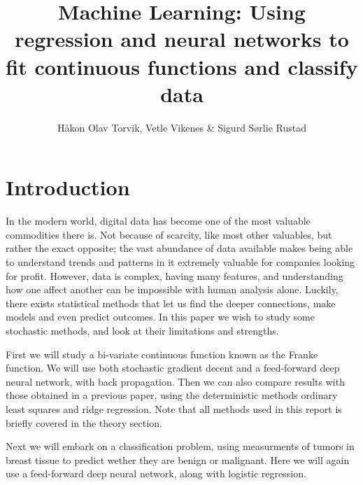 \documentclass[12pt]{extarticle}
\author{\Large Håkon Olav Torvik, Vetle Vikenes \& Sigurd Sørlie Rustad}
\title{\Huge Machine Learning: Using regression and neural networks to fit continuous functions and classify data}
\affiliation{\large FYS-STK4155 – Applied Data Analysis and Machine Learning
\\Autumn 2021\\Department of Physics\\University of Oslo\\\\\today}
\begin{document}
\maketitle
\pagestyle{myplain}









\section{Introduction}
In the modern world, digital data has become one of the most valuable commodities there is. Not because of scarcity, like most other valuables, but rather the exact opposite; the vast abundance of data available makes being able to understand trends and patterns in it extremely valuable for companies looking for profit. However, data is complex, having many features, and understanding how one affect another can be impossible with human analysis alone. Luckily, there exists statistical methods that let us find the deeper connections, make models and even predict outcomes. In this paper we wish to study some stochastic methods, and look at their limitations and strengths.

First we will study a bi-variate continuous function known as the Franke function. We will use both stochastic gradient decent and a feed-forward deep neural network, with back propagation. Then we can also compare results with those obtained in a previous paper, using the deterministic methods ordinary least squares and ridge regression. Note that all methods used in this report is briefly covered in the theory section.

Next we will embark on a classification problem, using measurments of tumors in breast tissue to predict wether they are benign or malignant. Here we will again use a feed-forward deep neural network, along with logistic regression.
\end{document}
